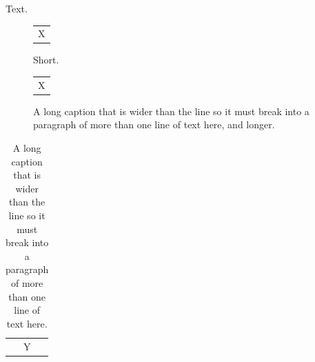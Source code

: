 \documentclass{article}
\begin{document}
Text.
\begin{figure}[h]
\centering
\begin{tabular}{c}X\end{tabular}
\caption{Short.}
\end{figure}
\begin{figure}[h]
\begin{tabular}{c}X\end{tabular}
\caption{A long caption that is wider than the line so it must break into a paragraph of more than one line of text here, and longer.}
\end{figure}
\begin{table}[h]
\captionsetup{font=larger,labelfont=smaller,textfont=sl,labelsep=quad}
\caption{A long caption that is wider than the line so it must break into a paragraph of more than one line of text here.}
\begin{tabular}{c}Y\end{tabular}
\end{table}
\end{document}

